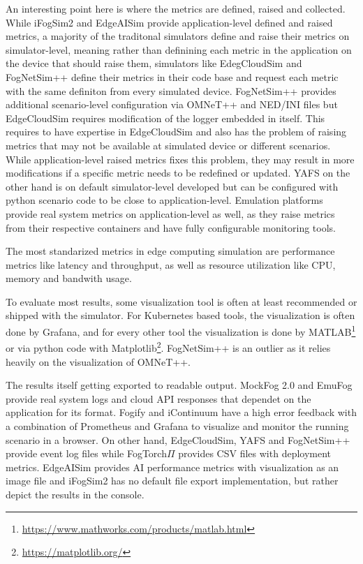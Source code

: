An interesting point here is where the metrics are defined, raised and collected.
While iFogSim2 and EdgeAISim provide application-level defined and raised metrics, a majority of the traditonal simulators define and raise their metrics on simulator-level, meaning rather than definining each metric in the application on the device that should raise them, simulators 
like EdegCloudSim and FogNetSim++ define their metrics in their code base and request each metric with the same definiton from every simulated device.
FogNetSim++ provides additional scenario-level configuration via OMNeT++ and NED/INI files but EdgeCloudSim requires modification of the logger embedded in itself.
This requires to have expertise in EdgeCloudSim and also has the problem of raising metrics that may not be available at simulated device or different scenarios.
While application-level raised metrics fixes this problem, they may result in more modifications if a specific metric needs to be redefined or updated.
YAFS on the other hand is on default simulator-level developed but can be configured with python scenario code to be close to application-level.
Emulation platforms provide real system metrics on application-level as well, as they raise metrics from their respective containers and have fully configurable monitoring tools.

The most standarized metrics in edge computing simulation are performance metrics like latency and throughput, as well as resource utilization like CPU, memory and bandwith usage.

To evaluate most results, some visualization tool is often at least recommended or shipped with the simulator.
For Kubernetes based tools, the visualization is often done by Grafana, and for every other tool the visualization is done by MATLAB\footnote{\url{https://www.mathworks.com/products/matlab.html}} or via python code with Matplotlib\footnote{\url{https://matplotlib.org/}}.
FogNetSim++ is an outlier as it relies heavily on the visualization of OMNeT++.

The results itself getting exported to readable output.
MockFog 2.0 and EmuFog provide real system logs and cloud API responses that dependet on the application for its format.
Fogify and iContinuum have a high error feedback with a combination of Prometheus and Grafana to visualize and monitor the running scenario in a browser.
On other hand, EdgeCloudSim, YAFS and FogNetSim++ provide event log files while FogTorch$\Pi$ provides CSV files with deployment metrics.
EdgeAISim provides AI performance metrics with visualization as an image file and iFogSim2 has no default file export implementation, but rather depict the results in the console.

